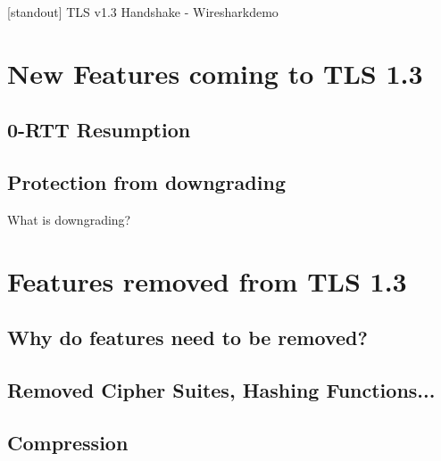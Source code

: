 \documentclass{f4_beamer_metropolis}
\begin{document}
\begin{frame}{}[standout]
  TLS v1.3 Handshake - Wiresharkdemo
\end{frame}

\section{New Features coming to TLS 1.3}

\subsection{0-RTT Resumption}

\begin{frame}{}

\end{frame}

\subsection{Protection from downgrading}

\begin{frame}{What is downgrading?}

\end{frame}

\section{Features removed from TLS 1.3}

\subsection{Why do features need to be removed?}

\begin{frame}{}

\end{frame}

\subsection{Removed Cipher Suites, Hashing Functions...}

\begin{frame}{}

\end{frame}

\subsection{Compression}
\end{document}
